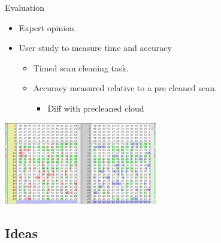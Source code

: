 \documentclass{beamer}
\begin{document}
\begin{frame}{Evaluation}
	\begin{itemize}
	\item Expert opinion
	\item User study to measure time and accuracy
	\begin{itemize}
	\item Timed scan cleaning task.
	\item Accuracy measured relative to a pre cleaned scan.
	\begin{itemize}
	\item Diff with precleaned cloud
	\end{itemize}
	\end{itemize}
	\end{itemize}

\centering
\includegraphics[width=0.5\textwidth]{pics/diff.png}

\end{frame}

\subsection{Ideas}
\end{document}
